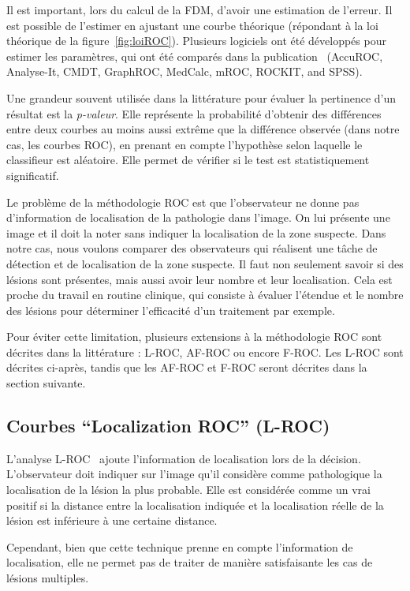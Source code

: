 Il est important, lors du calcul de la FDM, d'avoir une estimation de l'erreur. Il est possible de l'estimer en ajustant une courbe théorique (répondant à la loi théorique de la figure~\ref{fig:loiROC}). Plusieurs logiciels ont été développés pour estimer les paramètres, qui ont été comparés dans la publication~\cite{CarstenStephan03012003} (AccuROC, Analyse-It, CMDT, GraphROC, MedCalc, mROC, ROCKIT, and SPSS).

\label{lab:p-valeur}
Une grandeur souvent utilisée dans la littérature pour évaluer la pertinence d'un résultat est la \emph{p-valeur}. Elle représente la probabilité d'obtenir des différences entre deux courbes au moins aussi extrême que la différence observée (dans notre cas, les courbes ROC), en prenant en compte l'hypothèse selon laquelle le classifieur est aléatoire. Elle permet de vérifier si le test est statistiquement significatif.

Le problème de la méthodologie ROC est que l'observateur ne donne pas d'information de localisation de la pathologie dans l'image. On lui présente une image et il doit la noter sans indiquer la localisation de la zone suspecte. Dans notre cas, nous voulons comparer des observateurs qui réalisent une tâche de détection et de localisation de la zone suspecte. Il faut non seulement savoir si des lésions sont présentes, mais aussi avoir leur nombre et leur localisation. Cela est proche du travail en routine clinique, qui consiste à évaluer l'étendue et le nombre des lésions pour déterminer l'efficacité d'un traitement par exemple. 

Pour éviter cette limitation, plusieurs extensions à la méthodologie ROC sont décrites dans la littérature : L-ROC, AF-ROC ou encore F-ROC. Les L-ROC sont décrites ci-après, tandis que les AF-ROC et F-ROC seront décrites dans la section suivante.

\subsection{Courbes ``Localization ROC'' (L-ROC)}

L'analyse L-ROC~\cite{farquhar1999roc} ajoute l'information de localisation lors de la décision. L'observateur doit indiquer sur l'image qu'il considère comme pathologique la localisation de la lésion la plus probable. Elle est considérée comme un vrai positif si la distance entre la localisation indiquée et la localisation réelle de la lésion est inférieure à une certaine distance.

Cependant, bien que cette technique prenne en compte l'information de localisation, elle ne permet pas de traiter de manière satisfaisante les cas de lésions multiples.


